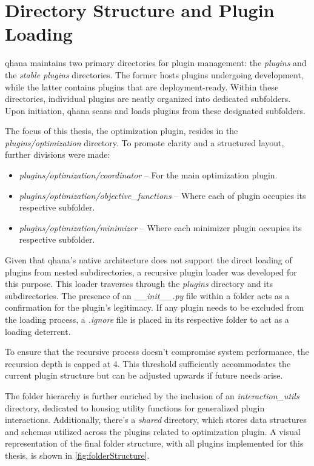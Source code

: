 \documentclass[
  a4paper,  %
  twoside,  %
  bibliography=totoc,
  headsepline,
  cleardoublepage=empty,
  parskip=half,
  draft=false
]{scrbook}
\begin{document}
\section{Directory Structure and Plugin Loading}
\label{sec:directoryStructure}

\gls{qhana} maintains two primary directories for plugin management: the \textit{plugins} and the \textit{stable plugins} directories.
The former hosts plugins undergoing development, while the latter contains plugins that are deployment-ready.
Within these directories, individual plugins are neatly organized into dedicated subfolders.
Upon initiation, \gls{qhana} scans and loads plugins from these designated subfolders.

The focus of this thesis, the optimization plugin, resides in the \textit{plugins/optimization} directory.
To promote clarity and a structured layout, further divisions were made:

\begin{itemize}
  \item \textit{plugins/optimization/coordinator} – For the main optimization plugin.
  \item \textit{plugins/optimization/objective\_functions} – Where each \gls{of} plugin occupies its respective subfolder.
  \item \textit{plugins/optimization/minimizer} – Where each minimizer plugin occupies its respective subfolder.
\end{itemize}

Given that \gls{qhana}'s native architecture does not support the direct loading of plugins from nested subdirectories, a recursive plugin loader was developed for this purpose.
This loader traverses through the \textit{plugins} directory and its subdirectories.
The presence of an \textit{\_\_init\_\_.py} file within a folder acts as a confirmation for the plugin's legitimacy.
If any plugin needs to be excluded from the loading process, a \textit{.ignore} file is placed in its respective folder to act as a loading deterrent.

To ensure that the recursive process doesn’t compromise system performance, the recursion depth is capped at 4.
This threshold sufficiently accommodates the current plugin structure but can be adjusted upwards if future needs arise.

The folder hierarchy is further enriched by the inclusion of an \textit{interaction\_utils} directory, dedicated to housing utility functions for generalized plugin interactions.
Additionally, there's a \textit{shared} directory, which stores data structures and schemas utilized across the plugins related to optimization plugin.
A visual representation of the final folder structure, with all plugins implemented for this thesis, is shown in \cref{fig:folderStructure}.
\end{document}
